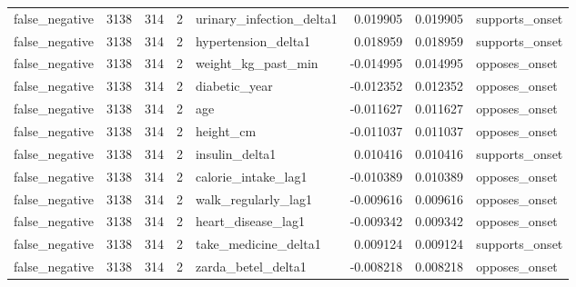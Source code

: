 \begin{tabular}{lrrrlrrl}
false\_negative & 3138 & 314 & 2 & urinary\_infection\_delta1 & 0.019905 & 0.019905 & supports\_onset \\
false\_negative & 3138 & 314 & 2 & hypertension\_delta1 & 0.018959 & 0.018959 & supports\_onset \\
false\_negative & 3138 & 314 & 2 & weight\_kg\_past\_min & -0.014995 & 0.014995 & opposes\_onset \\
false\_negative & 3138 & 314 & 2 & diabetic\_year & -0.012352 & 0.012352 & opposes\_onset \\
false\_negative & 3138 & 314 & 2 & age & -0.011627 & 0.011627 & opposes\_onset \\
false\_negative & 3138 & 314 & 2 & height\_cm & -0.011037 & 0.011037 & opposes\_onset \\
false\_negative & 3138 & 314 & 2 & insulin\_delta1 & 0.010416 & 0.010416 & supports\_onset \\
false\_negative & 3138 & 314 & 2 & calorie\_intake\_lag1 & -0.010389 & 0.010389 & opposes\_onset \\
false\_negative & 3138 & 314 & 2 & walk\_regularly\_lag1 & -0.009616 & 0.009616 & opposes\_onset \\
false\_negative & 3138 & 314 & 2 & heart\_disease\_lag1 & -0.009342 & 0.009342 & opposes\_onset \\
false\_negative & 3138 & 314 & 2 & take\_medicine\_delta1 & 0.009124 & 0.009124 & supports\_onset \\
false\_negative & 3138 & 314 & 2 & zarda\_betel\_delta1 & -0.008218 & 0.008218 & opposes\_onset \\
\bottomrule
\end{tabular}
